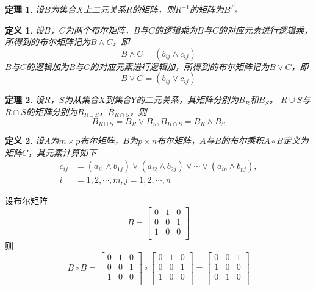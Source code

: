 \documentclass{book}[oneside]
\newtheorem{Def}{定义}[chapter]
\newtheorem{Thm}{定理}[chapter]
\begin{document}
\begin{CJK*}{UTF8}{gbsn}
  \begin{Thm}
    设$B$为集合$X$上二元关系$R$的矩阵，则$R^{-1}$的矩阵为$B^{T}$。
  \end{Thm}


   \begin{Def}
    设$B$，$C$为两个布尔矩阵，$B$与$C$的逻辑乘为$B$与$C$的对应元素进行逻辑乘，所得到的布尔矩阵记为$B \land C$，即
    \begin{equation*}
      B \land C = (b_{ij} \land c_{ij})
    \end{equation*}
    $B$与$C$的逻辑加为$B$与$C$的对应元素进行逻辑加，所得到的布尔矩阵记为$B \lor C$，即
    \begin{equation*}
      B \lor C = (b_{ij} \lor c_{ij})
    \end{equation*}
  \end{Def}
  \begin{Thm}
    设$R$，$S$为从集合$X$到集合$Y$的二元关系，其矩阵分别为$B_R$和$B_S$。 $R\cup S$与$R \cap S$的矩阵分别为$B_{R\cup S}$，$B_{R\cap S}$，则
    \begin{equation*}
      B_{R\cup S}=B_R \lor B_S, B_{R\cap S}=B_R \land B_S
    \end{equation*}
  \end{Thm}
  \begin{Def}
    设$A$为$m\times p$布尔矩阵，$B$为$p \times n$布尔矩阵，$A$与$B$的布尔乘积$A \circ B$定义为矩阵$C$，其元素计算如下
    \begin{align*}
      c_{ij} &= (a_{i1}\land b_{1j}) \lor (a_{i2} \land b_{2j}) \lor \cdots \lor (a_{ip} \land b_{pj}), \\
      i &= 1,2,\cdots, m, j = 1,2,\cdots, n
    \end{align*}
  \end{Def}
  设布尔矩阵
  \[B=\begin{bmatrix}
    0&1&0\\
    0&0&1\\
    1&0&0\\
  \end{bmatrix}
\]
则
\[B\circ B=\begin{bmatrix}
  0&1&0\\
  0&0&1\\
  1&0&0\\
\end{bmatrix}
\circ
\begin{bmatrix}
  0&1&0\\
  0&0&1\\
  1&0&0\\
\end{bmatrix}
=\begin{bmatrix}
  0&0&1\\
  1&0&0\\
  0&1&0\\
\end{bmatrix}\]


\end{CJK*}
\end{document}
